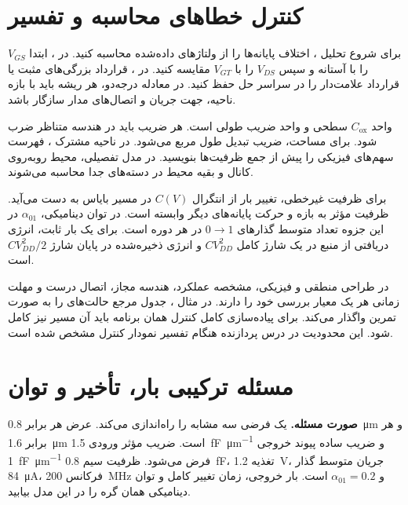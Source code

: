 \section*{کنترل خطاهای محاسبه و تفسیر}
{}
برای شروع تحلیل ، اختلاف پایانه‌ها را از ولتاژهای داده‌شده محاسبه کنید.
در ، ابتدا \(V_{GS}\) را با آستانه و سپس \(V_{DS}\) را با
\(V_{GT}\) مقایسه کنید. در ، قرارداد بزرگی‌های مثبت یا قرارداد
علامت‌دار را در سراسر حل حفظ کنید.
در معادله درجه‌دو، هر ریشه باید با بازه ناحیه، جهت جریان و اتصال‌های مدار سازگار باشد.

واحد \(C_{\mathrm{ox}}\) سطحی و واحد ضریب  طولی است.
هر ضریب باید در هندسه متناظر ضرب شود.
برای مساحت، ضریب تبدیل طول مربع می‌شود.
در ناحیه مشترک ، فهرست سهم‌های فیزیکی را پیش از جمع ظرفیت‌ها بنویسید.
در مدل تفصیلی، محیط روبه‌روی کانال و بقیه محیط در دسته‌های جدا محاسبه می‌شوند.

برای ظرفیت غیرخطی، تغییر بار از انتگرال \(C(V)\) در مسیر بایاس به دست می‌آید.
ظرفیت مؤثر به بازه و حرکت پایانه‌های دیگر وابسته است.
در توان دینامیکی، \(\alpha_{01}\) در این جزوه تعداد متوسط گذارهای
\(0\rightarrow1\) در هر دوره  است.
برای یک بار ثابت، انرژی دریافتی از منبع در یک شارژ کامل \(CV_{DD}^2\) و
انرژی ذخیره‌شده در پایان شارژ \(CV_{DD}^2/2\) است.

در طراحی منطقی و فیزیکی، مشخصه عملکرد، هندسه مجاز، اتصال درست و مهلت زمانی
هر یک معیار بررسی خود را دارند.
در مثال ، جدول  مرجع حالت‌های  را به صورت تمرین
واگذار می‌کند. برای پیاده‌سازی کامل کنترل همان برنامه باید آن مسیر نیز کامل شود.
این محدودیت در درس پردازنده هنگام تفسیر نمودار کنترل مشخص شده است.
\clearpage

\section*{مسئله ترکیبی بار، تأخیر و توان}
{}
\textbf{صورت مسئله.} یک  فرضی سه  مشابه را راه‌اندازی
می‌کند. عرض هر  برابر \qty{0.8}{\micro\metre} و هر  برابر
\qty{1.6}{\micro\metre} است. ضریب مؤثر ورودی
\qty{1.5}{\femto\farad\per\micro\metre} و ضریب ساده پیوند خروجی
\qty{1}{\femto\farad\per\micro\metre} فرض می‌شود.
ظرفیت سیم \qty{0.8}{\femto\farad}، تغذیه \qty{1.2}{\volt}، جریان متوسط
گذار \qty{84}{\micro\ampere}، فرکانس \qty{200}{\mega\hertz} و
\(\alpha_{01}=0.2\) است. بار خروجی، زمان تغییر کامل و توان دینامیکی همان گره
را در این مدل بیابید.

